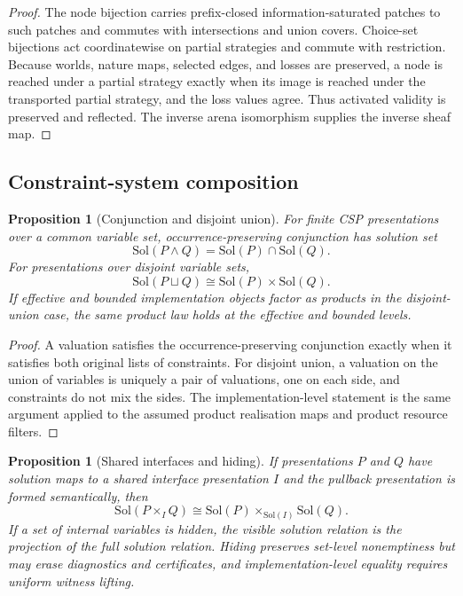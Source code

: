 \documentclass[11pt]{article}
\theoremstyle{plain}
\newtheorem{proposition}[theorem]{Proposition}
\theoremstyle{definition}
\theoremstyle{remark}
\begin{document}
\begin{proof}
The node bijection carries prefix-closed information-saturated patches to such
patches and commutes with intersections and union covers. Choice-set bijections
act coordinatewise on partial strategies and commute with restriction. Because
worlds, nature maps, selected edges, and losses are preserved, a node is reached
under a partial strategy exactly when its image is reached under the transported
partial strategy, and the loss values agree. Thus activated validity is preserved
and reflected. The inverse arena isomorphism supplies the inverse sheaf map.
\end{proof}

\subsection{Constraint-system composition}

\begin{proposition}[Conjunction and disjoint union]
\label{prop:csp-composition-monograph}
For finite CSP presentations over a common variable set, occurrence-preserving
conjunction has solution set
\[
\mathrm{Sol}(P\wedge Q)=\mathrm{Sol}(P)\cap\mathrm{Sol}(Q).
\]
For presentations over disjoint variable sets,
\[
\mathrm{Sol}(P\sqcup Q)\cong\mathrm{Sol}(P)\times\mathrm{Sol}(Q).
\]
If effective and bounded implementation objects factor as products in the
disjoint-union case, the same product law holds at the effective and bounded
levels.
\end{proposition}

\begin{proof}
A valuation satisfies the occurrence-preserving conjunction exactly when it
satisfies both original lists of constraints. For disjoint union, a valuation on
the union of variables is uniquely a pair of valuations, one on each side, and
constraints do not mix the sides. The implementation-level statement is the same
argument applied to the assumed product realisation maps and product resource
filters.
\end{proof}

\begin{proposition}[Shared interfaces and hiding]
\label{prop:pullback-hiding-monograph}
If presentations $P$ and $Q$ have solution maps to a shared interface
presentation $I$ and the pullback presentation is formed semantically, then
\[
\mathrm{Sol}(P\times_I Q)
\cong
\mathrm{Sol}(P)\times_{\mathrm{Sol}(I)}\mathrm{Sol}(Q).
\]
If a set of internal variables is hidden, the visible solution relation is the
projection of the full solution relation. Hiding preserves set-level nonemptiness
but may erase diagnostics and certificates, and implementation-level equality
requires uniform witness lifting.
\end{proposition}
\end{document}
